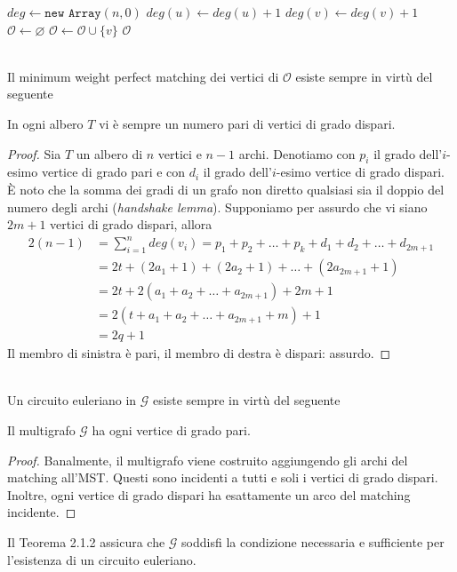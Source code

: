 \begin{algorithm}[H]
\caption{}
\begin{algorithmic}[1]
    \State $deg \gets \texttt{new Array}(n,0)$
        \State $deg(u) \gets deg(u)+1$
        \State $deg(v) \gets deg(v)+1$
    \EndFor
    \State
    \State $\mathcal{O} \gets \varnothing$
            \State $\mathcal{O} \gets \mathcal{O} \cup \{v\}$
        \EndIf
    \EndFor
    \State
    \State \Return $\mathcal{O}$
\EndFunction
\end{algorithmic}
\end{algorithm}
\ \\
Il minimum weight perfect matching dei vertici di $\mathcal{O}$ esiste sempre in 
virtù del seguente 
\begin{theorem}
    In ogni albero $T$ vi è sempre un numero pari di vertici di grado dispari.
\end{theorem}
\begin{proof}
    Sia $T$ un albero di $n$ vertici e $n-1$ archi. Denotiamo con $p_i$ il grado dell'$i$-esimo 
    vertice di grado pari e con $d_i$ il grado dell'$i$-esimo vertice di grado dispari. È noto che 
    la somma dei gradi di un grafo non diretto qualsiasi sia il doppio del numero degli archi 
    (\textit{handshake lemma}). Supponiamo per assurdo che vi siano $2m+1$ vertici di grado dispari, allora
    \begin{align*}
        2(n-1)  &= \displaystyle\sum_{i=1}^{n}{deg(v_i)} = p_1+p_2+\dots+p_k + d_1+d_2+\dots+d_{2m+1} \\
                &= 2t + (2a_1+1) + (2a_2+1) + \dots + (2a_{2m+1}+1) \\
                &= 2t + 2(a_1+a_2+\dots+a_{2m+1}) + 2m+1 \\
                &= 2(t + a_1+a_2+\dots+a_{2m+1}+m)+1 \\
                &= 2q+1
    \end{align*}
    Il membro di sinistra è pari, il membro di destra è dispari: assurdo.
\end{proof}
\ \\
Un circuito euleriano in $\mathcal{G}$ esiste sempre in virtù del seguente
\begin{theorem}
    Il multigrafo $\mathcal{G}$ ha ogni vertice di grado pari.
\end{theorem}
\begin{proof}
    Banalmente, il multigrafo viene costruito aggiungendo gli archi del matching all'MST. Questi 
    sono incidenti a tutti e soli i vertici di grado dispari. Inoltre, ogni vertice di grado dispari 
    ha esattamente un arco del matching incidente.
\end{proof}
Il Teorema 2.1.2 assicura che $\mathcal{G}$ soddisfi la condizione necessaria e sufficiente per l'esistenza 
di un circuito euleriano.
\ \\

